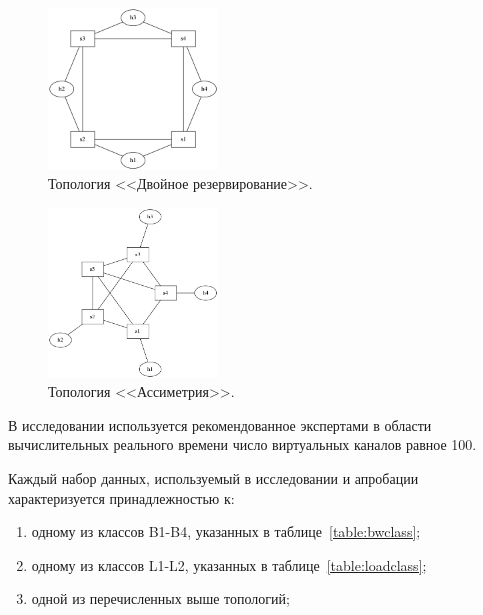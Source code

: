 \documentclass[12pt, a4paper]{article}
\begin{document}
\begin{figure}[h!]
	\centering
	\includegraphics[width=0.40\textwidth]{img/double.png}
	\caption[russian]{Топология <<Двойное резервирование>>.}
	\label{pic:double}
\end{figure}

\begin{figure}[h!]
	\centering
	\includegraphics[width=0.40\textwidth]{img/5node.png}
	\caption{Топология <<Ассиметрия>>.}
	\label{pic:5node}
\end{figure}

В исследовании используется рекомендованное экспертами в области вычислительных реального времени число виртуальных каналов равное 100.
\FloatBarrier

Каждый набор данных, используемый в исследовании и апробации характеризуется принадлежностью к:
\begin{enumerate}
	\item одному из классов B1-B4, указанных в таблице~\ref{table:bwclass};
	\item одному из классов L1-L2, указанных в таблице~\ref{table:loadclass};
	\item одной из перечисленных выше топологий;
\end{enumerate}
\end{document}
